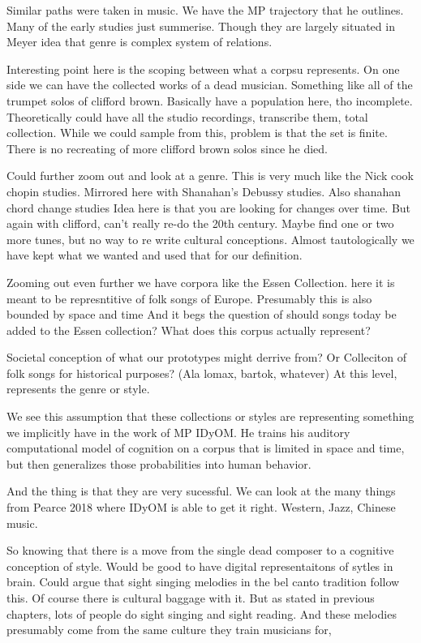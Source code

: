 \documentclass[]{book}
\begin{document}
Similar paths were taken in music.
We have the MP trajectory that he outlines.
Many of the early studies just summerise.
Though they are largely situated in Meyer idea that genre is complex system of relations.

Interesting point here is the scoping between what a corpsu represents.
On one side we can have the collected works of a dead musician.
Something like all of the trumpet solos of clifford brown.
Basically have a population here, tho incomplete.
Theoretically could have all the studio recordings, transcribe them, total collection.
While we could sample from this, problem is that the set is finite.
There is no recreating of more clifford brown solos since he died.

Could further zoom out and look at a genre.
This is very much like the Nick cook chopin studies.
Mirrored here with Shanahan's Debussy studies.
Also shanahan chord change studies
Idea here is that you are looking for changes over time.
But again with clifford, can't really re-do the 20th century.
Maybe find one or two more tunes, but no way to re write cultural conceptions.
Almost tautologically we have kept what we wanted and used that for our definition.

Zooming out even further we have corpora like the Essen Collection.
here it is meant to be represntitive of folk songs of Europe.
Presumably this is also bounded by space and time
And it begs the question of should songs today be added to the Essen collection?
What does this corpus actually represent?

Societal conception of what our prototypes might derrive from?
Or Colleciton of folk songs for historical purposes? (Ala lomax, bartok, whatever)
At this level, represents the genre or style.

We see this assumption that these collections or styles are representing something we implicitly have in the work of MP IDyOM.
He trains his auditory computational model of cognition on a corpus that is limited in space and time, but then generalizes those probabilities into human behavior.

And the thing is that they are very sucessful.
We can look at the many things from Pearce 2018 where IDyOM is able to get it right.
Western, Jazz, Chinese music.

So knowing that there is a move from the single dead composer to a cognitive conception of style.
Would be good to have digital representaitons of sytles in brain.
Could argue that sight singing melodies in the bel canto tradition follow this.
Of course there is cultural baggage with it.
But as stated in previous chapters, lots of people do sight singing and sight reading.
And these melodies presumably come from the same culture they train musicians for,
\end{document}
